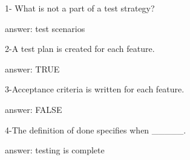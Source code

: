 1- What is not a part of a test strategy?

answer: test scenarios

2-A test plan is created for each feature.

answer: TRUE

3-Acceptance criteria is written for each feature.

answer: FALSE

4-The definition of done specifies when _____.

answer: testing is complete

